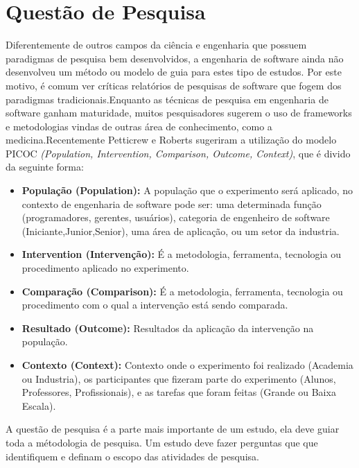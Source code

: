 \section{Questão de Pesquisa}

Diferentemente de outros campos da ciência e engenharia que possuem paradigmas de
pesquisa bem desenvolvidos, a engenharia de software ainda não desenvolveu um
método ou modelo de guia para estes tipo de estudos. Por este motivo, é
comum ver críticas relatórios de pesquisas de software que fogem dos paradigmas
tradicionais\cite{shaw}.Enquanto as técnicas de pesquisa em engenharia de software
ganham maturidade, muitos pesquisadores sugerem o uso de frameworks e metodologias
vindas de outras área de conhecimento, como a medicina\cite{guidelines}.Recentemente
Petticrew e Roberts sugeriram a utilização do modelo PICOC \textit{(Population,
Intervention, Comparison, Outcome, Context)}, que é divido da seguinte forma\cite{petticrew}:

\begin{itemize}
    \item \textbf{População (Population):} A população que o experimento será
        aplicado, no contexto de engenharia de software pode ser: uma determinada
        função (programadores, gerentes, usuários), categoria de engenheiro de
        software (Iniciante,Junior,Senior), uma área de aplicação, ou um setor
        da industria.
    \item \textbf{Intervention (Intervenção):} É a metodologia, ferramenta,
        tecnologia ou procedimento aplicado no experimento.
    \item \textbf{Comparação (Comparison):} É a metodologia, ferramenta,
        tecnologia ou procedimento com o qual a intervenção está sendo comparada.
    \item \textbf{Resultado  (Outcome):} Resultados da aplicação da intervenção na
        população.
    \item \textbf{Contexto (Context):} Contexto onde o experimento foi realizado
        (Academia ou Industria), os participantes que fizeram parte do experimento
        (Alunos, Professores, Profissionais), e as tarefas que foram feitas
        (Grande ou Baixa Escala).
\end{itemize}

A questão de pesquisa é a parte mais importante de um estudo, ela deve guiar toda
a métodologia de pesquisa. Um estudo deve fazer perguntas que que identifiquem e
definam o escopo das atividades de pesquisa\cite{guidelines}.

